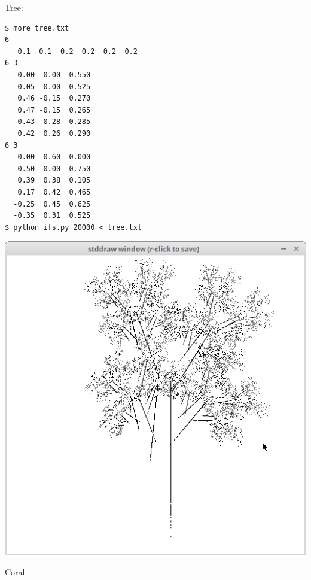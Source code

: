 \documentclass[8pt,a4paper,compress,handout]{beamer}
\begin{document}
\begin{frame}[fragile]
Tree:

\begin{minipage}{160pt}
\begin{lstlisting}[language={}]
$ more tree.txt
6
   0.1  0.1  0.2  0.2  0.2  0.2 
6 3
   0.00  0.00  0.550
  -0.05  0.00  0.525
   0.46 -0.15  0.270
   0.47 -0.15  0.265
   0.43  0.28  0.285
   0.42  0.26  0.290
6 3
   0.00  0.60  0.000
  -0.50  0.00  0.750
   0.39  0.38  0.105
   0.17  0.42  0.465
  -0.25  0.45  0.625
  -0.35  0.31  0.525
$ python ifs.py 20000 < tree.txt
\end{lstlisting}
\end{minipage}%
\begin{minipage}{140pt}
\hfill \includegraphics[scale=0.17]{figures/tree.png}
\end{minipage}

\bigskip

Coral:


\end{frame}
\end{document}
